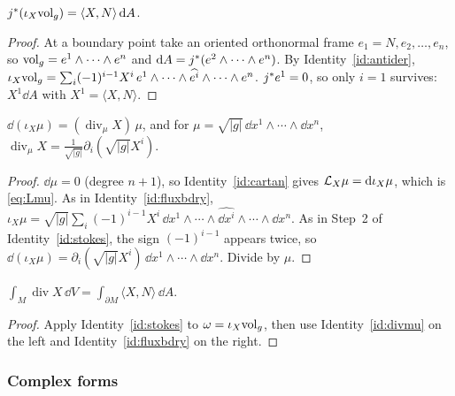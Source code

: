 \begin{identity}\label{id:fluxbdry}
$j{}^{*}(\iota_X\mathrm{vol}_g)=\langle X,N\rangle\,\mathrm{d} A$.
\end{identity}
\begin{proof}
 At a boundary point take an oriented orthonormal frame $e_1=N,e_2,\dots,e_n$, so $\mathrm{vol}_g=e^1\wedge\cdots\wedge e^n$ and $\mathrm{d} A=j{}^{*}(e^2\wedge\cdots\wedge e^n)$.
 By Identity~\ref{id:antider}, $\iota_X\mathrm{vol}_g=\sum_i(-1)^{i-1}X^i\,e^1\wedge\cdots\wedge\widehat{e^i}\wedge\cdots\wedge e^n$.
 $j{}^{*} e^1=0$, so only $i=1$ survives: $X^1\dd A$ with $X^1=\langle X,N\rangle$.
\end{proof}

\begin{identity}\label{id:divmu}
$\dd(\iota_X\mu)=(\operatorname{div}_\mu X)\,\mu$, and for $\mu=\sqrt{|g|}\,\dd x^1\wedge\cdots\wedge\dd x^n$, $\operatorname{div}_\mu X=\frac1{\sqrt{|g|}}\partial_i(\sqrt{|g|}X^i)$.
\end{identity}
\begin{proof}
 $\dd\mu=0$ (degree $n+1$), so Identity~\ref{id:cartan} gives $\mathcal{L}_X\mu=\mathrm{d}\iota_X\mu$, which is \eqref{eq:Lmu}.
 As in Identity~\ref{id:fluxbdry}, $\iota_X\mu=\sqrt{|g|}\sum_i(-1)^{i-1}X^i\,\dd x^1\wedge\cdots\wedge\widehat{\dd x^i}\wedge\cdots\wedge\dd x^n$.
 As in Step~2 of Identity~\ref{id:stokes}, the sign $(-1)^{i-1}$ appears twice, so $\dd(\iota_X\mu)=\partial_i(\sqrt{|g|}X^i)\,\dd x^1\wedge\cdots\wedge\dd x^n$. Divide by $\mu$.
\end{proof}

\begin{identity}\label{id:gauss}
$\int_M\operatorname{div}X\,\dd V=\int_{\partial M}\langle X,N\rangle\,\dd A$.
\end{identity}
\begin{proof}
Apply Identity~\ref{id:stokes} to $\omega=\iota_X\mathrm{vol}_g$, then use Identity~\ref{id:divmu} on the left and Identity~\ref{id:fluxbdry} on the right.
\end{proof}

\subsubsection*{Complex forms}

